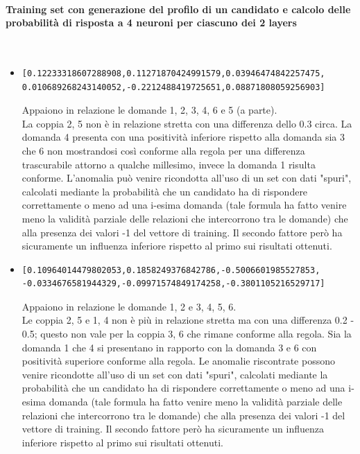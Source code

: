 \paragraph{Training set con generazione del profilo di un candidato e calcolo delle probabilit\`a di risposta a 4 neuroni per ciascuno dei 2 layers}\mbox{}
\label{Training set con generazione del profilo di un candidato e calcolo delle probabilita di risposta a 4 neuroni per ciascuno dei 2 layers}
\\
\noindent
\begin{itemize}
\item  \begin{verbatim}[0.12233318607288908,0.11271870424991579,0.03946474842257475,
0.010689268243140052,-0.2212488419725651,0.08871808059256903]
\end{verbatim}
Appaiono in relazione le domande 1, 2, 3, 4, 6 e 5 (a parte).\\
La coppia 2, 5 non \`e in relazione stretta con una differenza dello 0.3 circa. La domanda 4 presenta con una positivit\`a inferiore rispetto alla domanda sia 3 che 6 non mostrandosi cos\`i conforme alla regola per una differenza trascurabile attorno a qualche millesimo, invece la domanda 1 risulta conforme. L'anomalia pu\`o venire ricondotta all'uso di un set con dati "spuri", calcolati mediante la probabilit\`a che un candidato ha di rispondere correttamente o meno ad una i-esima domanda (tale formula ha fatto venire meno la validit\`a parziale delle relazioni che intercorrono tra le domande) che alla presenza dei valori -1 del vettore di training. Il secondo fattore per\`o ha sicuramente un influenza inferiore rispetto al primo sui risultati ottenuti.

\item \begin{verbatim}[0.10964014479802053,0.1858249376842786,-0.5006601985527853,
-0.0334676581944329,-0.09971574849174258,-0.3801105216529717]

\end{verbatim}
Appaiono in relazione le domande 1, 2  e 3, 4, 5, 6.\\
Le coppia 2, 5 e  1, 4 non \`e pi\`u in relazione stretta ma con una differenza 0.2 - 0.5; questo non vale per la coppia 3, 6 che rimane conforme alla regola. Sia la domanda 1 che 4 si presentano in rapporto con la domanda 3 e 6 con positivit\`a superiore conforme alla regola. 
Le anomalie riscontrate possono venire ricondotte all'uso di un set con dati "spuri", calcolati mediante la probabilit\`a che un candidato ha di rispondere correttamente o meno ad una i-esima domanda (tale formula ha fatto venire meno la validit\`a parziale delle relazioni che intercorrono tra le domande) che alla presenza dei valori -1 del vettore di training. Il secondo fattore per\`o ha sicuramente un influenza inferiore rispetto al primo sui risultati ottenuti.


\end{itemize}
